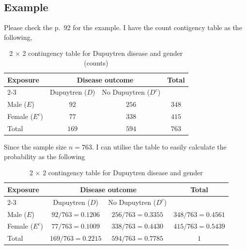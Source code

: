\subsection{Example}
Please check the p.~92 for the example. I have the count contigency table as the following,
\begin{table}[H]
    \centering
    \caption{2 $\times$ 2 contingency table for Dupuytren disease and gender (counts)}
    \label{tab:DupuytrenDiseaseExampleCountTable}
    \begin{tabular}{l|cc|c}
        \hline
        \multirow{2}{*}{Exposure} & \multicolumn{2}{c|}{Disease outcome} & \multirow{2}{*}{Total} \\
        \cline{2-3}
        & Dupuytren ($D$) & No Dupuytren ($D^c$) & \\
        \hline\hline
        Male ($E$)   & $92$  & $256$ & $348$ \\
        Female ($E^c$) & $77$  & $338$ & $415$ \\
        \hline
        Total & $169$ & $594$ & $763$ \\
        \hline
    \end{tabular}
\end{table}
Since the sample size $n=763$. I can utilise the table to easily calculate the probability as the following
\begin{table}[H]
    \centering
    \caption{2 $\times$ 2 contingency table for Dupuytren disease and gender}
    \label{tab:DupuytrenDiseaseExampleProbabilityTable}
    \begin{tabular}{l|cc|c}
        \hline
        \multirow{2}{*}{Exposure} & \multicolumn{2}{c|}{Disease outcome} & \multirow{2}{*}{Total} \\
        \cline{2-3}
        & Dupuytren ($D$) & No Dupuytren ($D^c$) & \\
        \hline\hline
        Male ($E$)   & $92/763 = 0.1206$  & $256/763 = 0.3355$ & $348/763 = 0.4561$ \\
        Female ($E^c$) & $77/763 = 0.1009$  & $338/763 = 0.4430$ & $415/763 = 0.5439$ \\
        \hline
        Total & $169/763 = 0.2215$ & $594/763 = 0.7785$ & $1$ \\
        \hline
    \end{tabular}
\end{table}

